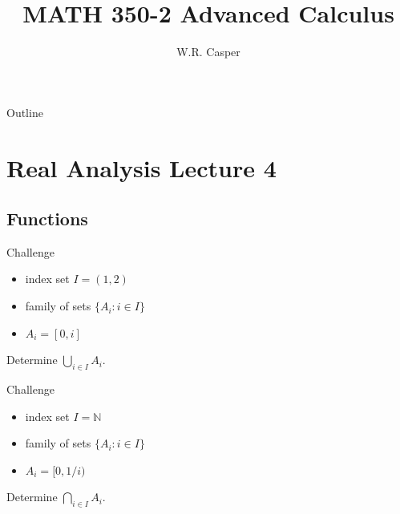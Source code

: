 \documentclass{beamer}
\title{MATH 350-2 Advanced Calculus}
\subtitle
{} %
\author[W.R. Casper] %
{W.R. Casper}
\institute[California State University Fullerton] %
{
  Department of Mathematics\\
  California State University Fullerton}
\begin{document}
\begin{frame}
  \titlepage
\end{frame}

\begin{frame}{Outline}
  \tableofcontents
\end{frame}



\section{Real Analysis Lecture 4}

\subsection{Functions}

\begin{frame}{Challenge}
\begin{itemize}
\item index set $I = (1,2)$
\item family of sets $\{A_i: i\in I\}$
\item $A_i = [0,i]$
\end{itemize}
\begin{prob}
Determine $\bigcup_{i\in I} A_i$.
\end{prob}
\end{frame}

\begin{frame}{Challenge}
\begin{itemize}
\item index set $I = \mathbb N$
\item family of sets $\{A_i: i\in I\}$
\item $A_i = [0,1/i)$
\end{itemize}
\begin{prob}
Determine $\bigcap_{i\in I} A_i$.
\end{prob}
\end{frame}
\end{document}
